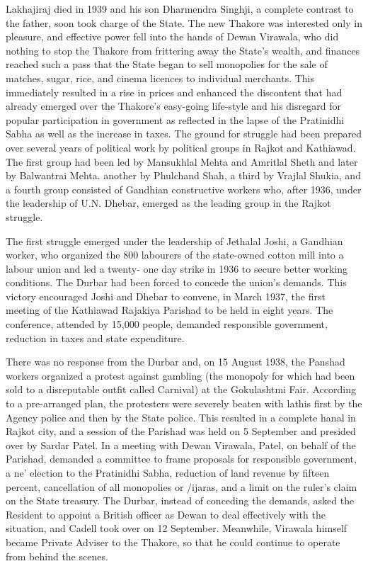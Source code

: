 \begin{multicols}{2}
Lakhajiraj died in 1939 and his son Dharmendra Singhji, a complete contrast to the father, soon took charge of the State. The new Thakore was interested only in pleasure, and effective power fell into the hands of Dewan Virawala, who did nothing to stop the Thakore from frittering away the State's wealth, and finances reached such a pass that the State began to sell monopolies for the sale of matches, sugar, rice, and cinema licences to individual merchants. This immediately resulted in a rise in prices and enhanced the discontent that had already emerged over the Thakore's easy-going life-style and his disregard for popular participation in government as reflected in the lapse of the Pratinidhi Sabha as well as the increase in taxes. The ground for struggle had been prepared over several years of political work by political groups in Rajkot and Kathiawad. The first group had been led by Mansukhlal Mehta and Amritlal Sheth and later by Balwantrai Mehta. another by Phulchand Shah, a third by Vrajlal Shukia, and a fourth group consisted of Gandhian constructive workers who, after 1936, under the leadership of U.N. Dhebar, emerged as the leading group in the Rajkot struggle. 

The first struggle emerged under the leadership of Jethalal Joshi, a Gandhian worker, who organized the 800 labourers of the state-owned cotton mill into a labour union and led a twenty- one day strike in 1936 to secure better working conditions. The Durbar had been forced to concede the union's demands. This victory encouraged Joshi and Dhebar to convene, in March 1937, the first meeting of the Kathiawad Rajakiya Parishad to be held in eight years. The conference, attended by 15,000 people, demanded responsible government, reduction in taxes and state expenditure. 

There was no response from the Durbar and, on 15 August 1938, the Panshad workers organized a protest against gambling (the monopoly for which had been sold to a disreputable outfit called Carnival) at the Gokulashtmi Fair. According to a pre-arranged plan, the protesters were severely beaten with lathis first by the Agency police and then by the State police. This resulted in a complete hanal in Rajkot city, and a session of the Parishad was held on 5 September and presided over by Sardar Patel. In a meeting with Dewan Virawala, Patel, on behalf of the Parishad, demanded a committee to frame proposals for responsible government, a ne' election to the Pratinidhi Sabha, reduction of land revenue by fifteen percent, cancellation of all monopolies or /ijaras, and a limit on the ruler's claim on the State treasury. The Durbar, instead of conceding the demands, asked the Resident to appoint a British officer as Dewan to deal effectively with the situation, and Cadell took over on 12 September. Meanwhile, Virawala himself became Private Adviser to the Thakore, so that he could continue to operate from behind the scenes. 


\end{multicols}

